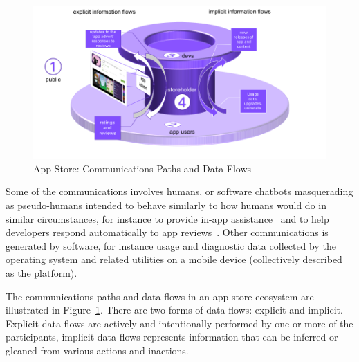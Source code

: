 \begin{figure}[htbp!]
    \centering
    \includegraphics[width=17cm]{images/app-store-data-flows-3d.png}
    \caption{App Store: Communications Paths and Data Flows}
    \label{fig:app-store-data-flows}
\end{figure}

Some of the communications involves humans, or software chatbots masquerading as pseudo-humans intended to behave similarly to how humans would do in similar circumstances, for instance to provide in-app assistance~\citep{baez2021_chatbot_integrations} and to help developers respond automatically to app reviews~\citep{greenheld2018_automating_developers_responses_to_app_reviews}. Other communications is generated by software, for instance usage and diagnostic data collected by the operating system and related utilities on a mobile device (collectively described as the platform).


The communications paths and data flows in an app store ecosystem are illustrated in Figure~\ref{fig:app-store-data-flows}. There are two forms of data flows: explicit and implicit. Explicit data flows are actively and intentionally performed by one or more of the participants, implicit data flows represents information that can be inferred or gleaned from various actions and inactions.

